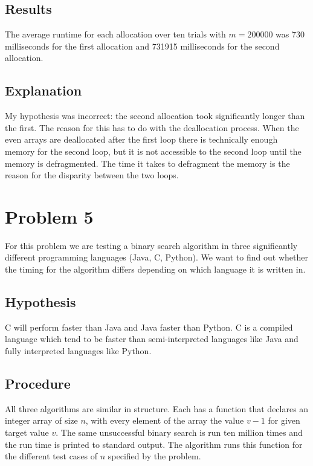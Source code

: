 \documentclass[11pt]{article}
\begin{document}
\subsection*{Results}

The average runtime for each allocation over ten trials with $m = 200000$ was 730 milliseconds for the first allocation and 731915 milliseconds for the second allocation.

\subsection*{Explanation}

My hypothesis was incorrect: the second allocation took significantly longer than the first. The reason for this has to do with the deallocation process. When the even arrays are deallocated after the first loop there is technically enough memory for the second loop, but it is not accessible to the second loop until the memory is defragmented. The time it takes to defragment the memory is the reason for the disparity between the two loops.

\section*{Problem 5}

For this problem we are testing a binary search algorithm in three significantly different programming languages (Java, C, Python). We want to find out whether the timing for the algorithm differs depending on which language it is written in.

\subsection*{Hypothesis}

C will perform faster than Java and Java faster than Python. C is a compiled language which tend to be faster than semi-interpreted languages like Java and fully interpreted languages like Python.

\subsection*{Procedure}

All three algorithms are similar in structure. Each has a function that declares an integer array of size $n$, with every element of the array the value $v - 1$ for given target value $v$. The same unsuccessful binary search is run ten million times and the run time is printed to standard output. The algorithm runs this function for the different test cases of $n$ specified by the problem.
\end{document}
